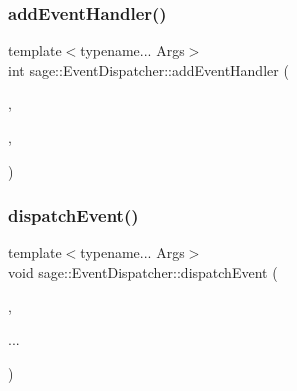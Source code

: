 \mbox{\label{classsage_1_1EventDispatcher_ae913c37fa0b821da626ecd4adfd16435}} 
\subsubsection{\texorpdfstring{addEventHandler()}{addEventHandler()}\hspace{0.1cm}{\footnotesize\ttfamily [2/2]}}
{\footnotesize\ttfamily template$<$typename... Args$>$ \\
int sage\+::\+Event\+Dispatcher\+::add\+Event\+Handler (\begin{DoxyParamCaption}\item[{\mbox{\hyperlink{namespacesage_ad2c7b0e1ebf67f572d43620e6b07aa13}{Node\+Event}}}]{,  }\item[{\mbox{\hyperlink{classsage_1_1Node}{Node}} $\ast$}]{,  }\item[{std\+::function$<$ void(Args...)$>$ \&\&}]{ }\end{DoxyParamCaption})}

\mbox{\label{classsage_1_1EventDispatcher_a096c6d68c684bb49ec1f8055c0e2a2d9}} 
\subsubsection{\texorpdfstring{dispatchEvent()}{dispatchEvent()}\hspace{0.1cm}{\footnotesize\ttfamily [1/2]}}
{\footnotesize\ttfamily template$<$typename... Args$>$ \\
void sage\+::\+Event\+Dispatcher\+::dispatch\+Event (\begin{DoxyParamCaption}\item[{\mbox{\hyperlink{namespacesage_afe706a25026cc74fe69b56d53a265d29}{Event}}}]{,  }\item[{Args \&\&}]{... }\end{DoxyParamCaption})}

\mbox{\label{classsage_1_1EventDispatcher_a508e38af7b9f87888fd9f37efecbb760}} 
